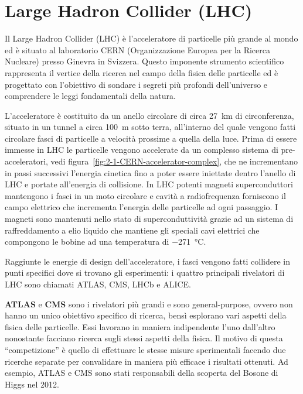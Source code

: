 \section{Large Hadron Collider (LHC)}
    Il Large Hadron Collider (LHC) è l’acceleratore di particelle più grande al mondo ed è situato al laboratorio CERN (Organizzazione Europea per la Ricerca Nucleare) presso Ginevra in Svizzera. Questo imponente strumento scientifico rappresenta il vertice della ricerca nel campo della fisica delle particelle ed è progettato con l’obiettivo di sondare i segreti più profondi dell’universo e comprendere le leggi fondamentali della natura.
    
    L’acceleratore è costituito da un anello circolare di circa \qty{27}{\kilo \meter} di circonferenza, situato in un tunnel a circa \qty{100}{\meter} sotto terra, all’interno del quale vengono fatti circolare fasci di particelle a velocità prossime a quella della luce. Prima di essere immesse in LHC le particelle vengono accelerate da un complesso sistema di pre-acceleratori, vedi figura~\ref{fig:2-1-CERN-accelerator-complex}, che ne incrementano in passi successivi l’energia cinetica fino a poter essere iniettate dentro l’anello di LHC e portate all’energia di collisione. In LHC potenti magneti superconduttori mantengono i fasci in un moto circolare e cavità a radiofrequenza forniscono il campo elettrico che incrementa l’energia delle particelle ad ogni passaggio. I magneti sono mantenuti nello stato di superconduttività grazie ad un sistema di raffreddamento a elio liquido che mantiene gli speciali cavi elettrici che compongono le bobine ad una temperatura di \qty{-271}{\degreeCelsius}.
    
    Raggiunte le energie di design dell'acceleratore, i fasci vengono fatti collidere in punti specifici dove si trovano gli esperimenti: i quattro principali rivelatori di LHC sono chiamati ATLAS, CMS, LHCb e ALICE.

    \textbf{ATLAS} e \textbf{CMS} sono i rivelatori più grandi e sono general-purpose, ovvero non hanno un unico obiettivo specifico di ricerca, bensì esplorano vari aspetti della fisica delle particelle. Essi lavorano in maniera indipendente l’uno dall’altro nonostante facciano ricerca sugli stessi aspetti della fisica. Il motivo di questa ``competizione'' è quello di effettuare le stesse misure sperimentali facendo due ricerche separate per convalidare in maniera più efficace i risultati ottenuti. Ad esempio, ATLAS e CMS sono stati responsabili della scoperta del Bosone di Higgs nel 2012.

